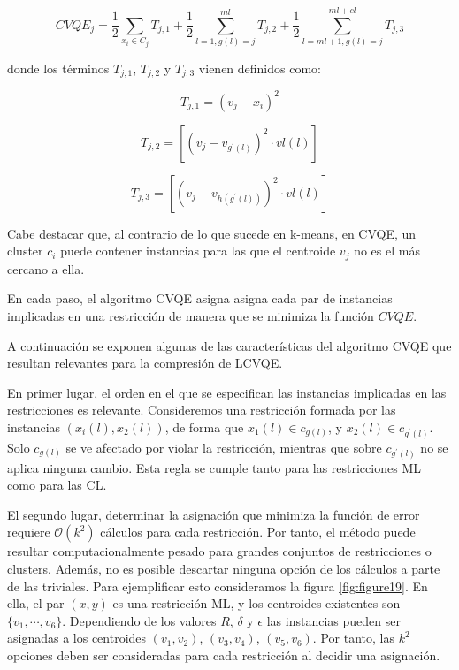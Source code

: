 \begin{equation}
CVQE_j = \frac{1}{2} \sum_{x_i \in C_j} T_{j,1} + 
\frac{1}{2} \sum_{l=1,g(l) = j}^{ml} T_{j,2} + 
\frac{1}{2} \sum_{l=ml + 1,g(l) = j}^{ml + cl} T_{j,3}
\label{eqn32}
\end{equation}

donde los términos $T_{j,1}$, $T_{j,2}$ y $T_{j,3}$ vienen definidos como: 

\begin{equation}
T_{j,1} = (v_j - x_i)^2
\label{eqn33}
\end{equation}

\begin{equation}
T_{j,2} = \left[ (v_j - v_{g^\prime(l)})^2 \cdot vl(l) \right]
\label{eqn34}
\end{equation}

\begin{equation}
T_{j,3} = \left[ (v_j - v_{h(g^\prime(l))})^2 \cdot vl(l) \right]
\label{eqn35}
\end{equation}

Cabe destacar que, al contrario de lo que sucede en k-means, en \acs{CVQE}, un cluster $c_i$ puede contener instancias para las que el centroide $v_j$ no es el más cercano a ella.

En cada paso, el algoritmo \acs{CVQE} asigna asigna cada par de instancias implicadas en una restricción de manera que se minimiza la función $CVQE$.

A continuación se exponen algunas de las características del algoritmo \acs{CVQE} que resultan relevantes para la compresión de \acs{LCVQE}.

En primer lugar, el orden en el que se especifican las instancias implicadas en las restricciones es relevante. Consideremos una restricción formada por las instancias $(x_i(l), x_2(l))$, de forma que $x_1(l) \in c_{g(l)}$, y $x_2(l) \in c_{g^\prime(l)}$. Solo $c_{g(l)}$ se ve afectado por violar la restricción, mientras que sobre $c_{g^\prime(l)}$ no se aplica ninguna cambio. Esta regla se cumple tanto para las restricciones \acf{ML} como para las \acf{CL}.

El segundo lugar, determinar la asignación que minimiza la función de error requiere $\mathcal{O}(k^2)$ cálculos para cada restricción. Por tanto, el método puede resultar computacionalmente pesado para grandes conjuntos de restricciones o clusters. Además, no es posible descartar ninguna opción de los cálculos a parte de las triviales. Para ejemplificar esto consideramos la figura \ref{fig:figure19}. En ella, el par $(x,y)$ es una restricción \acs{ML}, y los centroides existentes son $\{v_1,\cdots,v_6\}$. Dependiendo de los valores $R$, $\delta$ y $\epsilon$ las instancias pueden ser asignadas a los centroides $(v_1, v_2)$, $(v_3, v_4)$, $(v_5, v_6)$. Por tanto, las $k^2$ opciones deben ser consideradas para cada restricción al decidir una asignación.

